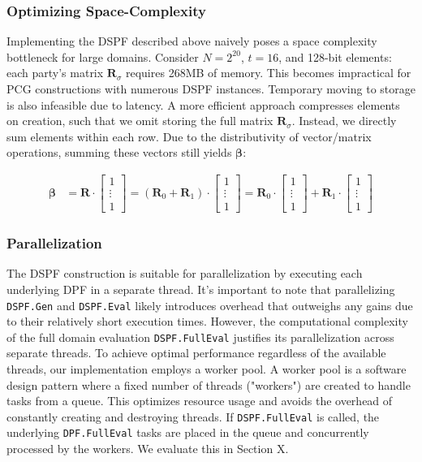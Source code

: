 \subsubsection{Optimizing Space-Complexity}
Implementing the DSPF described above naively poses a space complexity bottleneck for large domains. Consider  $N=2^{20}$, $t=16$, and 128-bit elements: each party's matrix $\boldsymbol{R}_\sigma$ requires 268MB of memory. This becomes impractical for PCG constructions with numerous DSPF instances.  Temporary moving to storage is also infeasible due to latency. A more efficient approach compresses elements on creation, such that we omit storing the full matrix $\boldsymbol{R}_\sigma$. Instead, we directly sum elements within each row. Due to the distributivity of vector/matrix operations, summing these vectors still yields $\boldsymbol{\beta}$:

\begin{equation}
\begin{aligned}
\label{eq:optimizedSpaceCompexity}
\boldsymbol{\beta} &= \boldsymbol{R} \cdot \begin{bmatrix} 1 \\ \vdots \\ 1 \end{bmatrix} = (\boldsymbol{R}_0 + \boldsymbol{R}_1 ) \cdot\begin{bmatrix} 1 \\ \vdots \\ 1 \end{bmatrix} = \boldsymbol{R}_0 \cdot\begin{bmatrix} 1 \\ \vdots \\ 1 \end{bmatrix} + \boldsymbol{R}_1 \cdot\begin{bmatrix} 1 \\ \vdots \\ 1 \end{bmatrix} 
\end{aligned}
\end{equation}

\subsubsection{Parallelization}
The DSPF construction is suitable for parallelization by executing each underlying DPF in a separate thread. It's important to note that parallelizing \texttt{DSPF.Gen} and \texttt{DSPF.Eval}  likely introduces overhead that outweighs any gains due to their relatively short execution times. However, the computational complexity of the full domain evaluation \texttt{DSPF.FullEval} justifies its parallelization across separate threads. To achieve optimal performance regardless of the available threads, our implementation employs a worker pool. A worker pool is a software design pattern where a fixed number of threads ("workers") are created to handle tasks from a queue. This optimizes resource usage and avoids the overhead of constantly creating and destroying threads. If \texttt{DSPF.FullEval} is called, the underlying \texttt{DPF.FullEval} tasks are placed in the queue and concurrently processed by the workers. We evaluate this in Section \todo X.

